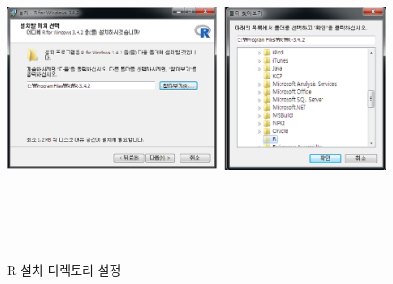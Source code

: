 \documentclass[12pt,a4paper]{book}
\begin{document}
\begin{figure}[h]
{
  \centering
  \includegraphics[width = 15cm, height = 10cm]{Figures/R-install-F03.png}
  \caption[R 설치 디렉토리 설정]{R 설치 디렉토리 설정}\label{fig:R-install-08}
}
\end{figure}

\renewcommand\bibname{References}

\end{document}
